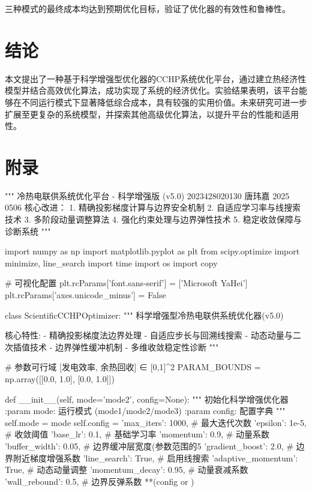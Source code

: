 \documentclass[a4paper,12pt]{article}
\begin{document}
三种模式的最终成本均达到预期优化目标，验证了优化器的有效性和鲁棒性。

\section{结论}
本文提出了一种基于科学增强型优化器的CCHP系统优化平台，通过建立热经济性模型并结合高效优化算法，成功实现了系统的经济优化。实验结果表明，该平台能够在不同运行模式下显著降低综合成本，具有较强的实用价值。未来研究可进一步扩展至更复杂的系统模型，并探索其他高级优化算法，以提升平台的性能和适用性。



\section{附录}
\begin{python}
"""
冷热电联供系统优化平台 - 科学增强版 (v5.0)
2023428020130
唐玮嘉
2025 0506
核心改进：
1. 精确投影梯度计算与边界安全机制
2. 自适应学习率与线搜索技术
3. 多阶段动量调整算法
4. 强化约束处理与边界弹性技术
5. 稳定收敛保障与诊断系统
"""

import numpy as np
import matplotlib.pyplot as plt
from scipy.optimize import minimize, line_search
import time
import os
import copy

# 可视化配置
plt.rcParams['font.sans-serif'] = ['Microsoft YaHei']
plt.rcParams['axes.unicode_minus'] = False

class ScientificCCHPOptimizer:
    """
    科学增强型冷热电联供系统优化器(v5.0)
    
    核心特性:
    - 精确投影梯度法边界处理
    - 自适应步长与回溯线搜索
    - 动态动量与二次插值技术
    - 边界弹性缓冲机制
    - 多维收敛稳定性诊断
    """
    
    # 参数可行域 [发电效率, 余热回收] ∈ [0,1]^2
    PARAM_BOUNDS = np.array([[0.0, 1.0], [0.0, 1.0]])
    
    def __init__(self, mode='mode2', config=None):
        """
        初始化科学增强优化器
        :param mode: 运行模式 (mode1/mode2/mode3)
        :param config: 配置字典
        """
        self.mode = mode
        self.config = {
            'max_iters': 1000,         # 最大迭代次数
            'epsilon': 1e-5,           # 收敛阈值
            'base_lr': 0.1,            # 基础学习率
            'momentum': 0.9,           # 动量系数
            'buffer_width': 0.05,      # 边界缓冲层宽度(参数范围的5%
            'gradient_boost': 2.0,     # 边界附近梯度增强系数
            'line_search': True,       # 启用线搜索
            'adaptive_momentum': True, # 动态动量调整
            'momentum_decay': 0.95,    # 动量衰减系数
            'wall_rebound': 0.5,       # 边界反弹系数
            **(config or {})
        }
        

\end{python}
\end{document}

